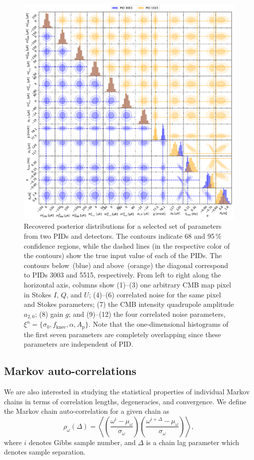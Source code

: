 \documentclass[twocolumn]{aa}%
\begin{document}
\begin{figure}[t]
  \center
  \includegraphics[width = 0.9\linewidth]{figs/anesthetic_plot_27M_lower_pid3003_upper_pid5515.pdf}
  \caption{Recovered posterior distributions for a selected set of parameters from two PIDs and detectors. The contours indicate 68 and 95\,\% confidence regions, while the dashed lines (in the respective color of the contours) show the true input value of each of the PIDs. The contours below~(blue) and above~(orange) the diagonal correspond to PIDs 3003 and 5515, respectively. From left to right along the horizontal axis, columns show (1)--(3) one arbitrary CMB map pixel in Stokes $I$, $Q$, and $U$; (4)--(6) correlated noise for the same pixel and Stokes parameters; (7) the CMB intensity quadrupole amplitude $a_{2,0}$; (8) gain $g$; and (9)--(12) the four correlated noise parameters, $\xi^n = \{\sigma_0,f_\mathrm{knee},\alpha,A_\mathrm{p}\}$. Note that the one-dimensional histograms of the first seven parameters are completely overlapping since these parameters are independent of PID.
}
  \label{fig:noise_corner}
\end{figure}


\subsection{Markov auto-correlations}

We are also interested in studying the statistical properties of
individual Markov chains in terms of correlation lengths,
degeneracies, and convergence. We define the Markov chain
auto-correlation for a given chain as
\begin{equation}
\rho_{\omega}(\Delta) = \left<\left(\frac{\omega^i-\mu_{\omega}}{\sigma_\omega}\right)
    \left(\frac{\omega^{i+\Delta}-\mu_{\omega}}{\sigma_\omega}\right) \right>,
\end{equation}
where $i$ denotes Gibbs sample number, and $\Delta$ is a chain lag parameter which denotes sample separation.
\end{document}
